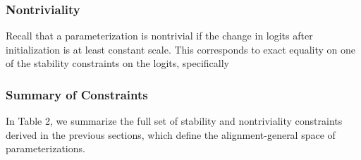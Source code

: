 \subsubsection{Nontriviality}
\label{app:theory_nontriviality}
Recall that a parameterization is nontrivial if the change in logits after initialization is at least constant scale. This corresponds to exact equality on one of the stability constraints on the logits, specifically
\begingroup
\renewcommand{\arraystretch}{1.5}
\begin{table}[h!]
\centering
{}
\end{table}
\endgroup

\subsubsection{Summary of Constraints}
\label{app:theory_summary_constraints}
In Table 2, we summarize the full set of stability and nontriviality constraints derived in the previous sections, which define the alignment-general space of parameterizations.
\clearpage
\newcommand{\STAB}[1]{\begin{tabular}{@{}c@{}}#1\end{tabular}}

